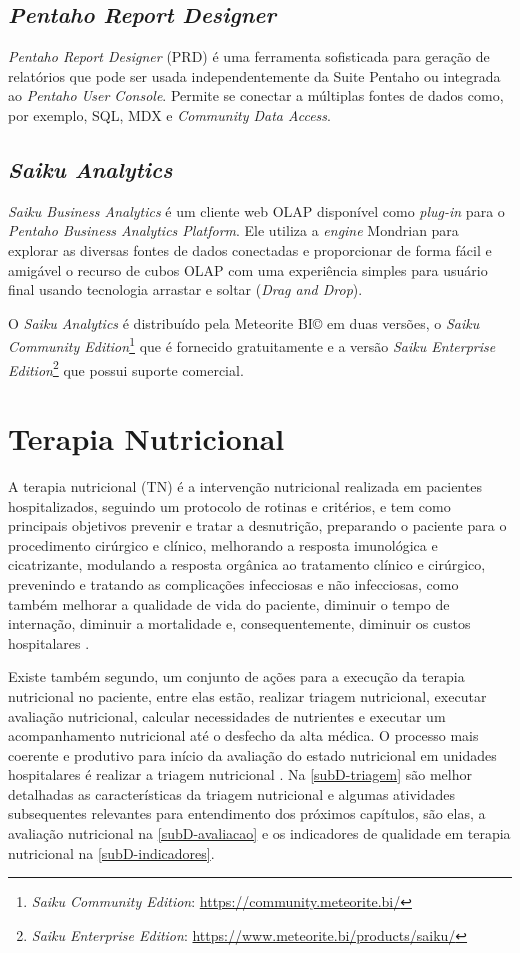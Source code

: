 \subsection{\textit{Pentaho Report Designer}}
\textit{Pentaho Report Designer} (PRD) é uma ferramenta sofisticada para geração de relatórios que pode ser usada independentemente da Suite Pentaho ou integrada ao \textit{Pentaho User Console}. Permite se conectar a múltiplas fontes de dados como, por exemplo, SQL, MDX e \textit{Community Data Access}.

\subsection{\textit{Saiku Analytics}}
\textit{Saiku Business Analytics} é um cliente web OLAP disponível como \textit{plug-in} para o \textit{Pentaho Business Analytics Platform}. Ele utiliza a \textit{engine} Mondrian para explorar as diversas fontes de dados conectadas e proporcionar de forma fácil e amigável o recurso de cubos OLAP com uma experiência simples para usuário final usando tecnologia arrastar e soltar (\textit{Drag and Drop}). 

O \textit{Saiku Analytics} é distribuído pela Meteorite BI© em duas versões, o \textit{Saiku Community Edition}\footnote{\textit{Saiku Community Edition}: \url{https://community.meteorite.bi/}} que é fornecido gratuitamente e a versão \textit{Saiku Enterprise Edition}\footnote{\textit{Saiku Enterprise Edition}: \url{https://www.meteorite.bi/products/saiku/}} que possui suporte comercial.

\section{Terapia Nutricional}
A terapia nutricional (TN) é a intervenção nutricional realizada em pacientes hospitalizados, seguindo um protocolo de rotinas e critérios, e tem como principais objetivos prevenir e tratar a desnutrição, preparando o paciente para o procedimento cirúrgico e clínico, melhorando a resposta imunológica e cicatrizante, modulando a resposta orgânica ao tratamento clínico e cirúrgico, prevenindo e tratando as complicações infecciosas e não infecciosas, como também melhorar a qualidade de vida do paciente, diminuir o tempo de internação, diminuir a mortalidade e, consequentemente, diminuir os custos hospitalares \cite{manualnutricao2016, mcclave2013}. 

Existe também segundo,  um conjunto de ações para a execução da terapia nutricional no paciente, entre elas estão, realizar triagem nutricional, executar avaliação nutricional, calcular necessidades de nutrientes e executar um acompanhamento nutricional até o desfecho da alta médica. O processo mais coerente e produtivo para início da avaliação do estado nutricional em unidades hospitalares é realizar a triagem nutricional \cite{protocolonutricionaladulto}. Na \autoref{subD-triagem} são melhor detalhadas as características da triagem nutricional e algumas atividades subsequentes relevantes para entendimento dos próximos capítulos, são elas, a avaliação nutricional na \autoref{subD-avaliacao} e os indicadores de qualidade em terapia nutricional na \autoref{subD-indicadores}. 


